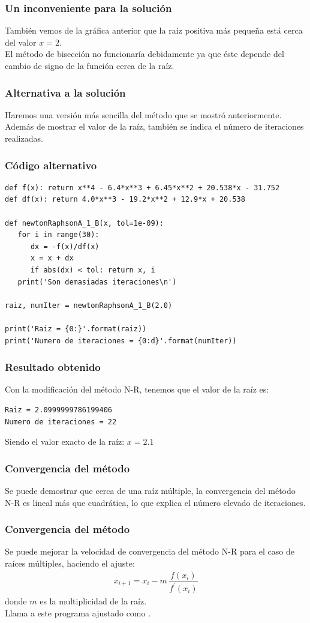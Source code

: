\begin{frame}
\frametitle{Un inconveniente para la solución}
También vemos de la gráfica anterior que la raíz positiva más pequeña está cerca del valor $x=2$.
\\
\bigskip
El método de bisección no funcionaría debidamente ya que éste depende del cambio de signo de la función cerca de la raíz.
\end{frame}
\begin{frame}
\frametitle{Alternativa a la solución}
Haremos una versión más sencilla del método  que se mostró anteriormente.
\\
\bigskip
Además de mostrar el valor de la raíz, también se indica el número de iteraciones realizadas.
\end{frame}
\begin{frame}
\frametitle{Código alternativo}
\begin{lstlisting}[caption=Código modificado del método N-R, style=codigopython]
def f(x): return x**4 - 6.4*x**3 + 6.45*x**2 + 20.538*x - 31.752
def df(x): return 4.0*x**3 - 19.2*x**2 + 12.9*x + 20.538
   
def newtonRaphsonA_1_B(x, tol=1e-09):
   for i in range(30):
      dx = -f(x)/df(x)
      x = x + dx
      if abs(dx) < tol: return x, i
   print('Son demasiadas iteraciones\n')

raiz, numIter = newtonRaphsonA_1_B(2.0)

print('Raiz = {0:}'.format(raiz))
print('Numero de iteraciones = {0:d}'.format(numIter))
\end{lstlisting}
\end{frame}
\begin{frame}[fragile]
\frametitle{Resultado obtenido}
Con la modificación del método N-R, tenemos que el valor de la raíz es:
\begin{verbatim}
Raiz = 2.0999999786199406
Numero de iteraciones = 22
\end{verbatim}
\pause
Siendo el valor exacto de la raíz: $x = 2.1$
\end{frame}
\begin{frame}[fragile]
\frametitle{Convergencia del método}
Se puede demostrar que cerca de una raíz múltiple, la convergencia del método N-R es lineal más que cuadrática, lo que explica el número elevado de iteraciones.
\end{frame}
\begin{frame}
\frametitle{Convergencia del método}
Se puede mejorar la velocidad de convergencia del método N-R para el caso de raíces múltiples, haciendo el ajuste:
\begin{align*}
x_{i+1} = x_{i} - m \, \dfrac{f(x_{i})}{f^{\prime}(x_{i})}
\end{align*}
donde $m$ es la multiplicidad de la raíz.
\\
\bigskip
Llama a este programa ajustado como .
\end{frame}
